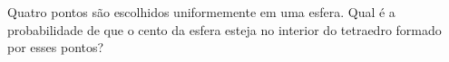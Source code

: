 Quatro pontos são escolhidos uniformemente em uma esfera. Qual é a probabilidade de que o cento da esfera esteja no interior do tetraedro formado por esses pontos?
